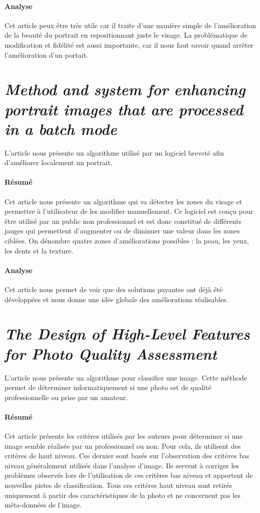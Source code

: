 \documentclass[11pt, french]{report-rd-info}
\begin{document}
\paragraph{Analyse}
Cet article peux être très utile car il traite d'une manière simple de l'amélioration de la beauté du portrait en repositionnant juste le visage. La problématique de modification et fidélité est aussi importante, car il nous faut savoir quand arrêter l'amélioration d'un portait.

\section{\emph{Method and system for enhancing portrait images that are processed in a batch mode}}
L'article \cite{Matraszek2004} nous présente un algorithme utilisé par un logiciel breveté afin d'améliorer localement un portrait.

\paragraph{Résumé}
Cet article nous présente un algorithme qui va détecter les zones du visage et permettre à l'utilisateur de les modifier manuellement. Ce logiciel est conçu pour être utilisé par un public non professionnel et est donc constitué de différents jauges qui permettent d'augmenter ou de diminuer une valeur dans les zones ciblées. On dénombre quatre zones d'améliorations possibles : la peau, les yeux, les dents et la texture.

\paragraph{Analyse}
Cet article nous permet de voir que des solutions payantes ont déjà été développées et nous donne une idée globale des améliorations réalisables.


\section{\emph{The Design of High-Level Features for Photo Quality Assessment}}
L'article \cite{Ke} nous présente un algorithme pour classifier une image. Cette méthode permet de déterminer informatiquement si une photo est de qualité professionnelle ou prise par un amateur.

\paragraph{Résumé}
Cet article présente les critères utilisés par les auteurs pour déterminer si une image semble réalisée par un professionnel ou non. Pour cela, ils utilisent des critères de haut niveau. Ces dernier sont basés sur l'observation des critères bas niveau généralement utilisés dans l'analyse d'image. Ils servent à corriger les problèmes observés lors de l'utilisation de ces critères bas niveau et apportent de nouvelles pistes de classification.
Tous ces critères haut niveau sont retirés uniquement à partir des caractéristiques de la photo et ne concernent pas les méta-données de l'image.
\end{document}
